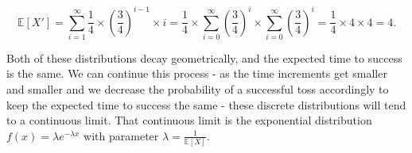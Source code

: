 \documentclass{article}
\begin{document}


$$\mathbb{E}[X']=\sum_{i=1}^\infty \frac{1}{4}\times\left(\frac{3}{4}\right)^{i-1}\times i=\frac{1}{4}\times \sum_{i=0}^\infty \left(\frac{3}{4}\right)^{i}\times \sum_{i=0}^\infty \left(\frac{3}{4}\right)^{i}=\frac{1}{4}\times 4\times 4=4.$$

\noindent Both of these distributions decay geometrically, and the expected time to success is the same. We can continue this process - as the time increments get smaller and smaller and we decrease the probability of a successful toss accordingly to keep the expected time to success the same - these discrete distributions will tend to a continuous limit. That continuous limit is the exponential distribution $f(x)=\lambda e^{-\lambda x}$ with parameter $\lambda=\frac{1}{\mathbb{E}[X]}$.
\end{document}
